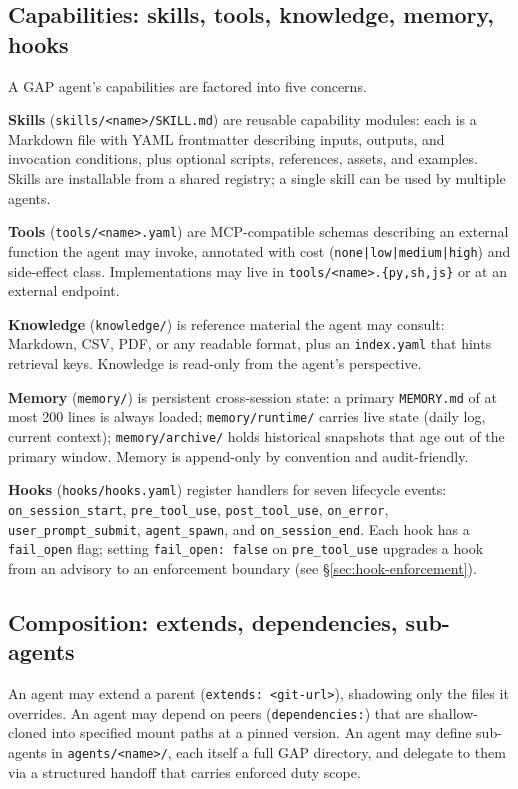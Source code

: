 \documentclass[11pt,a4paper]{article}
\begin{document}
\subsection{Capabilities: skills, tools, knowledge, memory, hooks}

A GAP agent's capabilities are factored into five concerns.

\textbf{Skills} (\texttt{skills/<name>/SKILL.md}) are reusable capability modules:
each is a Markdown file with YAML frontmatter describing inputs, outputs, and
invocation conditions, plus optional scripts, references, assets, and examples.
Skills are installable from a shared registry; a single skill can be used by
multiple agents.

\textbf{Tools} (\texttt{tools/<name>.yaml}) are MCP-compatible schemas describing
an external function the agent may invoke, annotated with cost
(\texttt{none|low|medium|high}) and side-effect class. Implementations may live in
\texttt{tools/<name>.\{py,sh,js\}} or at an external endpoint.

\textbf{Knowledge} (\texttt{knowledge/}) is reference material the agent may consult:
Markdown, CSV, PDF, or any readable format, plus an \texttt{index.yaml} that hints
retrieval keys. Knowledge is read-only from the agent's perspective.

\textbf{Memory} (\texttt{memory/}) is persistent cross-session state: a primary
\texttt{MEMORY.md} of at most 200 lines is always loaded; \texttt{memory/runtime/}
carries live state (daily log, current context); \texttt{memory/archive/} holds
historical snapshots that age out of the primary window. Memory is append-only by
convention and audit-friendly.

\textbf{Hooks} (\texttt{hooks/hooks.yaml}) register handlers for seven lifecycle
events: \texttt{on\_session\_start}, \texttt{pre\_tool\_use}, \texttt{post\_tool\_use},
\texttt{on\_error}, \texttt{user\_prompt\_submit}, \texttt{agent\_spawn}, and
\texttt{on\_session\_end}. Each hook has a \texttt{fail\_open} flag; setting
\texttt{fail\_open: false} on \texttt{pre\_tool\_use} upgrades a hook from an advisory
to an enforcement boundary (see \S\ref{sec:hook-enforcement}).

\subsection{Composition: extends, dependencies, sub-agents}

An agent may extend a parent (\texttt{extends: <git-url>}), shadowing only the files
it overrides. An agent may depend on peers (\texttt{dependencies:}) that are
shallow-cloned into specified mount paths at a pinned version. An agent may define
sub-agents in \texttt{agents/<name>/}, each itself a full GAP directory, and delegate
to them via a structured handoff that carries enforced duty scope.
\end{document}
